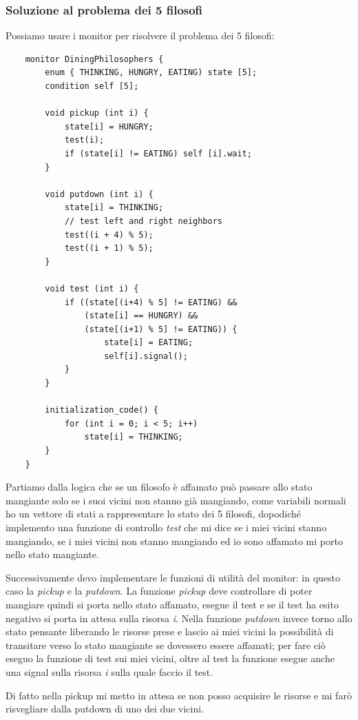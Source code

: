\subsubsection{Soluzione al problema dei 5 filosofi}
Possiamo usare i monitor per risolvere il problema dei 5 filosofi:
\begin{verbatim}
    monitor DiningPhilosophers {
        enum { THINKING, HUNGRY, EATING) state [5];
        condition self [5];

        void pickup (int i) {
            state[i] = HUNGRY;
            test(i);
            if (state[i] != EATING) self [i].wait;
        }

        void putdown (int i) {
            state[i] = THINKING;
            // test left and right neighbors
            test((i + 4) % 5);
            test((i + 1) % 5);
        }

        void test (int i) {
            if ((state[(i+4) % 5] != EATING) &&
                (state[i] == HUNGRY) &&
                (state[(i+1) % 5] != EATING)) {
                    state[i] = EATING;
                    self[i].signal();
            }
        }

        initialization_code() {
            for (int i = 0; i < 5; i++)
                state[i] = THINKING;
        }
    }
\end{verbatim}
Partiamo dalla logica che se un filosofo è affamato può passare allo stato mangiante solo se i suoi vicini non stanno già mangiando, come variabili normali ho un vettore di stati a rappresentare lo stato dei 5 filosofi, dopodiché implemento una funzione di controllo \emph{test} che mi dice se i miei vicini stanno mangiando, se i miei vicini non stanno mangiando ed io sono affamato mi porto nello stato mangiante.

Successivamente devo implementare le funzioni di utilità del monitor: in questo caso la \emph{pickup} e la \emph{putdown}.
La funzione \emph{pickup} deve controllare di poter mangiare quindi si porta nello stato affamato, esegue il test e se il test ha esito negativo si porta in attesa sulla risorsa \emph{i}.
Nella funzione \emph{putdown} invece torno allo stato pensante liberando le risorse prese e lascio ai miei vicini la possibilità di transitare verso lo stato mangiante se dovessero essere affamati; per fare ciò eseguo la funzione di test sui miei vicini, oltre al test la funzione esegue anche una signal sulla risorsa \emph{i} sulla quale faccio il test. 

Di fatto nella pickup mi metto in attesa se non posso acquisire le risorse e mi farò risvegliare dalla putdown di uno dei due vicini.

